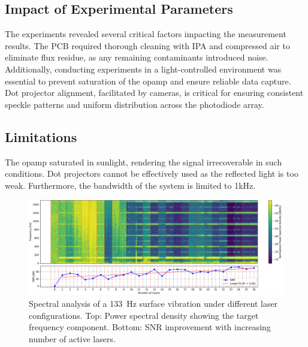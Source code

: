 \subsection{Impact of Experimental Parameters}

The experiments revealed several critical factors impacting the measurement results. 
The PCB required thorough cleaning with IPA and compressed air to eliminate flux residue, as any remaining contaminants introduced noise. 
Additionally, conducting experiments in a light-controlled environment was essential to prevent saturation of the opamp and ensure reliable data capture. 
Dot projector alignment, facilitated by cameras, is critical for ensuring consistent speckle patterns and uniform distribution across the photodiode array.

\subsection{Limitations}
The opamp saturated in sunlight, rendering the signal irrecoverable in such conditions. Dot projectors cannot be effectively used as the reflected light is too weak.
Furthermore, the bandwidth of the system is limited to 1kHz.


\begin{figure}[t]
    \centering
    \includegraphics[width=\textwidth]{figures/results/multilaser_spectrogram}
    \caption{Spectral analysis of a 133~Hz surface vibration under different laser configurations. 
    Top: Power spectral density showing the target frequency component. Bottom: SNR improvement with increasing number of active lasers.}
    \label{fig:laser_snr}
\end{figure}
